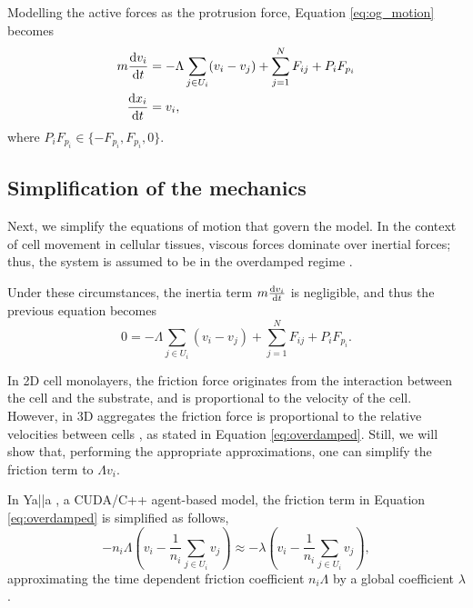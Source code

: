 \begin{remark}
    Modelling the active forces as the protrusion force, Equation \ref{eq:og_motion} becomes
    \begin{align}\label{eq:moton_fp}
        \begin{aligned}
            m\frac{\mathrm{d} v_i}{\mathrm{d} t} &=-\Lambda\sum_{j\in U_i}(v_i-v_j)+
            \sum_{j=1}^{N} F_{ij} + P_i F_{p_i}\\
            \frac{\mathrm{d} x_i}{\mathrm{d} t} &=v_i,
        \end{aligned}
    \end{align}
    where $P_i F_{p_i}\in\{-F_{p_i},F_{p_i},0\}.$
\end{remark}


\subsection{Simplification of the mechanics}\label{sec:simplify}

Next, we simplify the equations of motion that govern the model. In the context of cell movement in cellular tissues, viscous forces dominate over inertial forces; thus, the system is assumed to be in the overdamped regime \parencite{Purcell_1977,Liedekerke_2015}. 

Under these circumstances, the inertia term $m\frac{\mathrm{d} v_i}{\mathrm{d} t}$ is negligible, and thus the previous equation becomes
\begin{equation}\label{eq:overdamped}
    0 =-\Lambda\sum_{j\in U_i}(v_i-v_j)+
    \sum_{j=1}^{N} F_{ij} + P_i F_{p_i}.
\end{equation}

In 2D cell monolayers, the friction force originates from the interaction between the cell and the substrate, and is proportional to the velocity of the cell. However, in 3D aggregates the friction force is proportional to the relative velocities between cells \parencite{Liedekerke_2015}, as stated in Equation \ref{eq:overdamped}. Still, we will show that, performing the appropriate approximations, one can simplify the friction term to $\Lambda v_i$.

In Ya||a \parencite{Germann_2019}, a CUDA/C++ agent-based model, the friction term in Equation \ref{eq:overdamped} is simplified as follows,
\begin{equation}
    -n_i \Lambda \left(v_i - \frac{1}{n_i}\sum_{j\in U_i}v_j\right)
    \approx -\lambda \left(v_i - \frac{1}{n_i}\sum_{j\in U_i}v_j\right),
\end{equation}
approximating the time dependent friction coefficient $n_i\Lambda$ by a global coefficient $\lambda$. 

